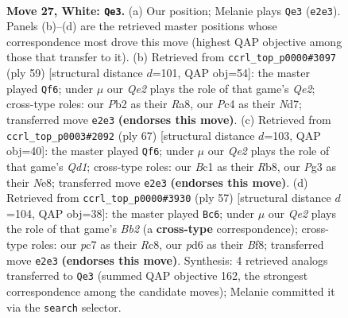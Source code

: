 \documentclass[11pt]{article}
\begin{document}
\begin{figure}[p]\centering
\begin{subfigure}{0.46\textwidth}\centering
\resizebox{\linewidth}{!}{%
\newchessgame
\chessboard[
  setfen={r1bq1rk1/2pn1pb1/1p1p1n2/3P3p/p1P4P/P2B2P1/1PN1Q3/RNB2RK1 w - - 3 27},
  showmover=false,
  pgfstyle=straightmove, color=movearrow, markmove={e2-e3}
]}
\caption{}
\end{subfigure}\hfill
\begin{subfigure}{0.46\textwidth}\centering
\resizebox{\linewidth}{!}{%
\newchessgame
\chessboard[
  setfen={r1r3k1/3nqpp1/b3n2p/p3p3/P1NpP2P/2P3P1/1P1N1P2/R1RQ1BK1 b - - 2 30},
  showmover=false,
  pgfstyle=straightmove, color=movearrow, markmove={e7-f6}
]}
\caption{}
\end{subfigure}
\\[4pt]
\begin{subfigure}{0.46\textwidth}\centering
\resizebox{\linewidth}{!}{%
\newchessgame
\chessboard[
  setfen={1rrqn1k1/5pp1/p2p2np/1b1Pp3/1PN1P3/1Q5P/R2N1PPK/4RB2 b - - 6 34},
  showmover=false,
  pgfstyle=straightmove, color=movearrow, markmove={d8-f6}
]}
\caption{}
\end{subfigure}\hfill
\begin{subfigure}{0.46\textwidth}\centering
\resizebox{\linewidth}{!}{%
\newchessgame
\chessboard[
  setfen={2r2br1/1bqn1p1k/p2pp1pp/P7/3BPP2/1NN1Q3/1PP1R1PP/3R3K b - - 10 29},
  showmover=false,
  pgfstyle=straightmove, color=movearrow, markmove={b7-c6}
]}
\caption{}
\end{subfigure}
\caption{\textbf{Move 27, White: \texttt{Qe3}.} (a) Our position; Melanie plays \texttt{Qe3} (\texttt{e2e3}). Panels (b)--(d) are the retrieved master positions whose correspondence most drove this move (highest QAP objective among those that transfer to it). (b) Retrieved from \texttt{ccrl\_top\_p0000\#3097} (ply 59) [structural distance $d$=101, QAP obj=54]: the master played \texttt{Qf6}; under $\mu$ our \emph{Qe2} plays the role of that game's \emph{Qe2}; cross-type roles: our \emph{P}b2 as their \emph{R}a8, our \emph{P}c4 as their \emph{N}d7; transferred move \texttt{e2e3} \textbf{(endorses this move)}. (c) Retrieved from \texttt{ccrl\_top\_p0003\#2092} (ply 67) [structural distance $d$=103, QAP obj=40]: the master played \texttt{Qf6}; under $\mu$ our \emph{Qe2} plays the role of that game's \emph{Qd1}; cross-type roles: our \emph{B}c1 as their \emph{R}b8, our \emph{P}g3 as their \emph{N}e8; transferred move \texttt{e2e3} \textbf{(endorses this move)}. (d) Retrieved from \texttt{ccrl\_top\_p0000\#3930} (ply 57) [structural distance $d$=104, QAP obj=38]: the master played \texttt{Bc6}; under $\mu$ our \emph{Qe2} plays the role of that game's \emph{Bb2} (a \textbf{cross-type} correspondence); cross-type roles: our \emph{p}c7 as their \emph{R}c8, our \emph{p}d6 as their \emph{B}f8; transferred move \texttt{e2e3} \textbf{(endorses this move)}. Synthesis: 4 retrieved analogs transferred to \texttt{Qe3} (summed QAP objective 162, the strongest correspondence among the candidate moves); Melanie committed it via the \texttt{search} selector.}
\label{fig:thought-m52}
\end{figure}
\end{document}
